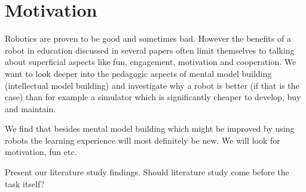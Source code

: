 \section{Motivation}
Robotics are proven to be good and sometimes bad. However the benefits of a robot in education discussed in several papers often limit themselves to talking about superficial aspects like fun, engagement, motivation and cooperation. We want to look deeper into the pedagogic aspects of mental model building (intellectual model building) and investigate why a robot is better (if that is the case) than for example a simulator which is significantly cheaper to develop, buy and maintain. 

We find that besides mental model building which might be improved by using robots the learning experience will most definitely be new. We will look for motivation, fun etc. 

Present our literature study findings. Should literature study come before the task itself?

